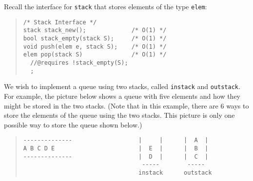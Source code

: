 \documentclass[12pt]{exam}
\begin{document}
\begin{questions}
\newpage




Recall the interface for \texttt{stack} that stores
elements of the type \texttt{elem}:

\begin{quote}
\begin{verbatim}
/* Stack Interface */
stack stack_new();             /* O(1) */
bool stack_empty(stack S);     /* O(1) */
void push(elem e, stack S);    /* O(1) */
elem pop(stack S)              /* O(1) */
  //@requires !stack_empty(S);
  ;
\end{verbatim}
\end{quote}

We wish to implement a queue using two stacks, called \texttt{instack} and \texttt{outstack}. For example, the picture below shows a queue with five elements and how they might be stored in the two stacks. (Note that in this example, there are 6 ways to store the elements of the queue using the two stacks. This picture is only one possible way to store the queue shown below.)
\begin{quote}
\begin{verbatim}
--------------                   |     |      |  A  |
A B C D E                        |  E  |      |  B  |
--------------                   |  D  |      |  C  |
                                  -----        -----
                                 instack      outstack
\end{verbatim}


\end{quote}
\end{questions}
\end{document}
